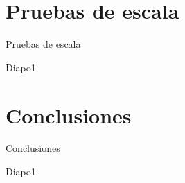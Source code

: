 \documentclass[xcolor=svgnames]{beamer}
\begin{document}
\section{Pruebas de escala}

\begin{frame}{}
	\begin{center}
		\huge{Pruebas de escala}
	\end{center}
\end{frame}

\begin{frame}{Diapo1}
	
\end{frame}





\section{Conclusiones}

\begin{frame}{}
	\begin{center}
		\huge{Conclusiones}
	\end{center}
\end{frame}

\begin{frame}{Diapo1}
	
\end{frame}

%
%
%
\end{document}
